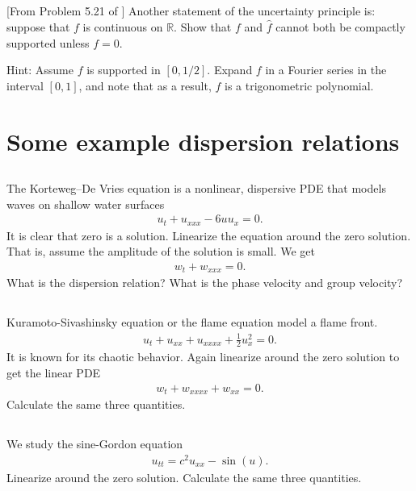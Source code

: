 \documentclass[11pt,letterpaper]{report}
\begin{document}
\subsection{}
[From Problem 5.21 of \cite{SteinShakarchi_03}] Another statement of the uncertainty principle is: suppose that $f$ is continuous on $\mathbb{R}$. Show that $f$ and $\hat f$ cannot both be compactly supported unless $f = 0$. 

Hint: Assume $f$ is supported in $[0, 1/2]$. Expand $f$ in a Fourier series in the
interval $[0, 1]$, and note that as a result, $f$ is a trigonometric polynomial.

\section{Some example dispersion relations}
\subsection{}
The Korteweg–De Vries equation is a nonlinear, dispersive PDE that models waves on shallow water surfaces
\begin{align}
    u_t+u_{xxx}-6uu_x = 0.
\end{align}
It is clear that zero is a solution. Linearize the equation around the zero solution. That is, assume the amplitude of the solution is small. We get
\begin{align}
    w_t+w_{xxx} = 0.
\end{align}
What is the dispersion relation? What is the phase velocity and group velocity?

\subsection{}
Kuramoto-Sivashinsky equation or the flame equation model a flame front. 
\begin{align}
    u_t+u_{xx}+u_{xxxx}+\frac{1}{2}u_x^2 = 0.
\end{align}
It is known for its chaotic behavior. Again linearize around the zero solution to get the linear PDE
\begin{align}
    w_t+w_{xxxx}+w_{xx} = 0.
\end{align}
Calculate the same three quantities.

\subsection{}
We study the sine-Gordon equation
\begin{align}
    u_{tt} = c^2u_{xx}-\sin(u).
\end{align}
Linearize around the zero solution. Calculate the same three quantities.
\end{document}
